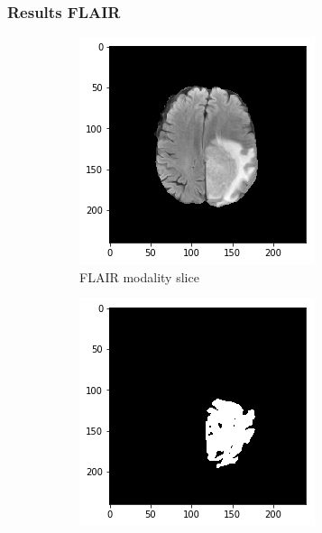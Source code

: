 \subsubsection{Results FLAIR}

\begin{figure}[H]

    
    \centering
    \begin{subfigure}[t]{.4\textwidth}
    
        \centering
        \includegraphics[width=\linewidth]{chapters/06_hdm/b_Brats18_TCIA08_242_1_L2/36.png}
        \caption{FLAIR modality slice}
    \end{subfigure}\hspace{1cm}%
    \begin{subfigure}[t]{.4\textwidth}
        \centering
        \includegraphics[width=\linewidth]{chapters/06_hdm/b_Brats18_TCIA08_242_1_L2/35.png}

\end{subfigure}
\end{figure}
